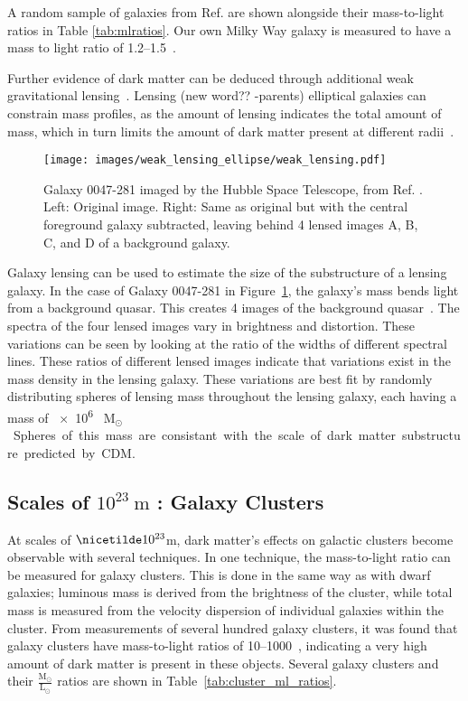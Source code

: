 A random sample of galaxies from Ref. \cite{faber_ml} are shown alongside their mass-to-light ratios in Table \ref{tab:mlratios}.
Our own Milky Way galaxy is measured to have a mass to light ratio of \SIrange{1.2}{1.5}{}~\cite{milkyway_ml_ratio}.

Further evidence of dark matter can be deduced through additional weak gravitational lensing~\cite{weak_lensing_2001}.
{\color{red}Lensing (new word?? -parents)} elliptical galaxies can constrain mass profiles, as the amount of lensing indicates the total amount of mass, which in turn limits the amount of dark matter present at different radii~\cite{weak_lensing_ellipse}.

\begin{figure}[!b]
  \centering
  \texttt{[image: images/weak\_lensing\_ellipse/weak\_lensing.pdf]}
  \caption[Weak Lensing with an Ellipse Galaxy]{
    Galaxy 0047-281 imaged by the Hubble Space Telescope, from Ref. \cite{weak_lensing_ellipse}.
    Left: Original image.
    Right: Same as original but with the central foreground galaxy subtracted, leaving behind 4 lensed images A, B, C, and D of a background galaxy.
  }
  \label{fig:ellipse}
\end{figure}
    
Galaxy lensing can be used to estimate the size of the substructure of a lensing galaxy.
In the case of Galaxy 0047-281 in Figure~\ref{fig:ellipse}, the galaxy's mass bends light from a background quasar.
This creates 4 images of the background quasar~\cite{weak_lensing_quasar}.
The spectra of the four lensed images vary in brightness and distortion.
These variations can be seen by looking at the ratio of the widths of different spectral lines.
These ratios of different lensed images indicate that variations exist in the mass density in the lensing galaxy.
These variations are best fit by randomly distributing spheres of lensing mass throughout the lensing galaxy, each having a mass of \SI{e6}{ M${{}_\odot}$ }.
Spheres of this mass are consistant with the scale of dark matter substructure predicted by CDM.

\subsection{Scales of $10^{23}\:\text{m}$ : Galaxy Clusters}\label{dm_galclusters}
%
At scales of $\nicetilde 10^{23}$m, dark matter's effects on galactic clusters become observable with several techniques.
In one technique, the mass-to-light ratio can be measured for galaxy clusters.
This is done in the same way as with dwarf galaxies; luminous mass is derived from the brightness of the cluster, while total mass is measured from the velocity dispersion of individual galaxies within the cluster.
From measurements of several hundred galaxy clusters, it was found that galaxy clusters have mass-to-light ratios of \SIrange{10}{1000}{}~\cite{cluster_ml_ratios}, indicating a very high amount of dark matter is present in these objects.
Several galaxy clusters and their $\frac{\textrm{M}_\odot}{\textrm{L}_\odot}$ ratios are shown in Table~\ref{tab:cluster_ml_ratios}.

